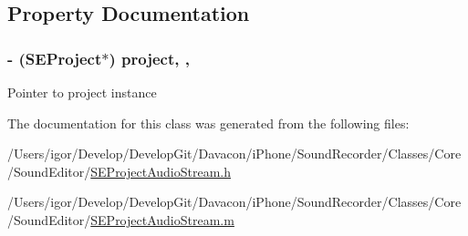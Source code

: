 \subsection{Property Documentation}
\hypertarget{interface_s_e_project_audio_stream_ac6d00d41ed2dffb56d3a00533a26e6cd}{
\subsubsection[{project}]{\setlength{\rightskip}{0pt plus 5cm}-\/ ({\bf S\-E\-Project}$\ast$) project\hspace{0.3cm}{\ttfamily [read]}, {\ttfamily [nonatomic]}, {\ttfamily [assign]}}}\label{interface_s_e_project_audio_stream_ac6d00d41ed2dffb56d3a00533a26e6cd}
Pointer to project instance 

The documentation for this class was generated from the following files\-:\begin{DoxyCompactItemize}
\item 
/\-Users/igor/\-Develop/\-Develop\-Git/\-Davacon/i\-Phone/\-Sound\-Recorder/\-Classes/\-Core/\-Sound\-Editor/\hyperlink{_s_e_project_audio_stream_8h}{S\-E\-Project\-Audio\-Stream.\-h}\item 
/\-Users/igor/\-Develop/\-Develop\-Git/\-Davacon/i\-Phone/\-Sound\-Recorder/\-Classes/\-Core/\-Sound\-Editor/\hyperlink{_s_e_project_audio_stream_8m}{S\-E\-Project\-Audio\-Stream.\-m}\end{DoxyCompactItemize}

